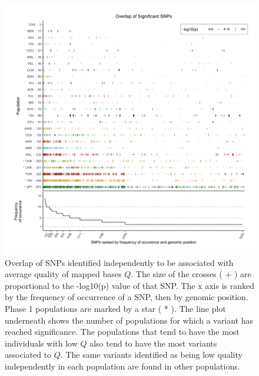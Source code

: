 \documentclass[
11pt, %
oneside, %
english, %
doublespacing, %
headsepline, %
chapterinoneline, %
]{MastersDoctoralThesis} %
\begin{document}
\begin{figure}
\includegraphics[width=\hsize,keepaspectratio]{./Figures/SNPOverlap6.jpg}

\caption{Overlap of SNPs identified independently to be associated with average quality of mapped bases $Q$.
The size of the crosses ( + ) are proportional to the -log10(p) value of that SNP.
The x axis is ranked by the frequency of occurrence of a SNP, then by genomic position.
Phase 1 populations are marked by a star ( * ).
The line plot underneath shows the number of populations for which a variant has reached significance.
The populations that tend to have the most individuals with low $Q$ also tend to have the most variants associated to $Q$. 
The same variants identified as being low quality independently in each population are found in other populations. }
  \label{OverLap}
\end{figure}
\end{document}
